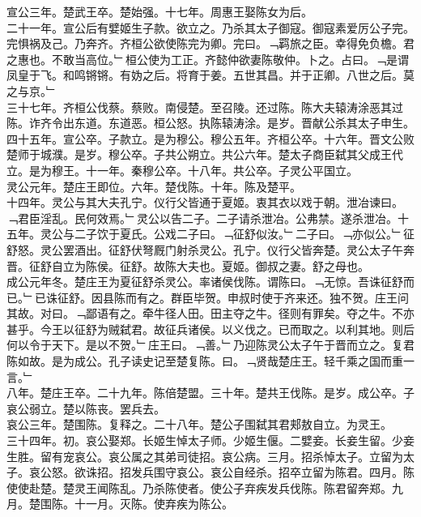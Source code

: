 \documentclass{zhvt-classic}
\begin{document}
\hspace*{2em}宣公三年。楚武王卒。楚始强。十七年。周惠王娶陈女为后。\\
\hspace*{2em}二十一年。宣公后有嬖姬生子款。欲立之。乃杀其太子御寇。御寇素爱厉公子完。完惧祸及己。乃奔齐。齐桓公欲使陈完为卿。完曰。﹁羁旅之臣。幸得免负檐。君之惠也。不敢当高位。﹂桓公使为工正。齐懿仲欲妻陈敬仲。卜之。占曰。﹁是谓凤皇于飞。和鸣锵锵。有妫之后。将育于姜。五世其昌。并于正卿。八世之后。莫之与京。﹂\\
\hspace*{2em}三十七年。齐桓公伐蔡。蔡败。南侵楚。至召陵。还过陈。陈大夫辕涛涂恶其过陈。诈齐令出东道。东道恶。桓公怒。执陈辕涛涂。是岁。晋献公杀其太子申生。\\
\hspace*{2em}四十五年。宣公卒。子款立。是为穆公。穆公五年。齐桓公卒。十六年。晋文公败楚师于城濮。是岁。穆公卒。子共公朔立。共公六年。楚太子商臣弑其父成王代立。是为穆王。十一年。秦穆公卒。十八年。共公卒。子灵公平国立。\\
\hspace*{2em}灵公元年。楚庄王即位。六年。楚伐陈。十年。陈及楚平。\\
\hspace*{2em}十四年。灵公与其大夫孔宁。仪行父皆通于夏姬。衷其衣以戏于朝。泄冶谏曰。﹁君臣淫乱。民何效焉。﹂灵公以告二子。二子请杀泄冶。公弗禁。遂杀泄冶。十五年。灵公与二子饮于夏氏。公戏二子曰。﹁征舒似汝。﹂二子曰。﹁亦似公。﹂征舒怒。灵公罢酒出。征舒伏弩厩门射杀灵公。孔宁。仪行父皆奔楚。灵公太子午奔晋。征舒自立为陈侯。征舒。故陈大夫也。夏姬。御叔之妻。舒之母也。\\
\hspace*{2em}成公元年冬。楚庄王为夏征舒杀灵公。率诸侯伐陈。谓陈曰。﹁无惊。吾诛征舒而已。﹂已诛征舒。因县陈而有之。群臣毕贺。申叔时使于齐来还。独不贺。庄王问其故。对曰。﹁鄙语有之。牵牛径人田。田主夺之牛。径则有罪矣。夺之牛。不亦甚乎。今王以征舒为贼弑君。故征兵诸侯。以义伐之。已而取之。以利其地。则后何以令于天下。是以不贺。﹂庄王曰。﹁善。﹂乃迎陈灵公太子午于晋而立之。复君陈如故。是为成公。孔子读史记至楚复陈。曰。﹁贤哉楚庄王。轻千乘之国而重一言。﹂\\
\hspace*{2em}八年。楚庄王卒。二十九年。陈倍楚盟。三十年。楚共王伐陈。是岁。成公卒。子哀公弱立。楚以陈丧。罢兵去。\\
\hspace*{2em}哀公三年。楚围陈。复释之。二十八年。楚公子围弑其君郏敖自立。为灵王。\\
\hspace*{2em}三十四年。初。哀公娶郑。长姬生悼太子师。少姬生偃。二嬖妾。长妾生留。少妾生胜。留有宠哀公。哀公属之其弟司徒招。哀公病。三月。招杀悼太子。立留为太子。哀公怒。欲诛招。招发兵围守哀公。哀公自经杀。招卒立留为陈君。四月。陈使使赴楚。楚灵王闻陈乱。乃杀陈使者。使公子弃疾发兵伐陈。陈君留奔郑。九月。楚围陈。十一月。灭陈。使弃疾为陈公。\\
\end{document}
